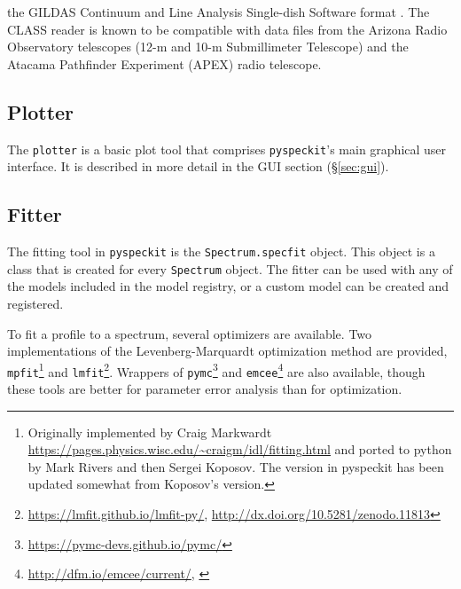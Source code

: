 \documentclass[twocolumn]{aastex63}
\newcommand{\pyspeckit}{\texttt{pyspeckit}\xspace}
\begin{document}
\begin{itemize}
        the GILDAS Continuum and Line Analysis Single-dish Software format
        \citep[CLASS;][]{Gildas-Team2013a}.  
        The CLASS reader is known to be compatible with data files from
        the Arizona Radio Observatory telescopes (12-m and 10-m Submillimeter
        Telescope) and the Atacama Pathfinder Experiment (APEX) radio
        telescope.
\end{itemize}

\subsection{Plotter}
The \texttt{plotter} is a basic plot tool that comprises \pyspeckit's main
graphical user interface.
It is described in more detail in the  GUI section (\S \ref{sec:gui}).


\subsection{Fitter}
\label{sec:fitters}
The fitting tool in \pyspeckit is the \texttt{Spectrum.specfit} object.
This object is a class that is created for every \texttt{Spectrum} object.
The fitter can be used with any of the models included in the model
registry, or a custom model can be created and registered.

To fit a profile to a spectrum, several optimizers are available.  Two
implementations of the Levenberg-Marquardt optimization method
\citep{Levenberg1944a,Marquardt1963a} are provided,
\texttt{mpfit}\footnote{Originally implemented by Craig Markwardt
\url{https://pages.physics.wisc.edu/~craigm/idl/fitting.html} and ported to python
by Mark Rivers and then Sergei Koposov.  The version in pyspeckit has been
updated somewhat from Koposov's version.} and
\texttt{lmfit}\footnote{\url{https://lmfit.github.io/lmfit-py/},
\url{http://dx.doi.org/10.5281/zenodo.11813}}.  Wrappers of
\texttt{pymc}\footnote{\url{https://pymc-devs.github.io/pymc/}} and
\texttt{emcee}\footnote{\url{http://dfm.io/emcee/current/},
\citet{Foreman-Mackey2013a}} are also available, though these tools are better
for parameter error analysis than for optimization.
\end{document}

